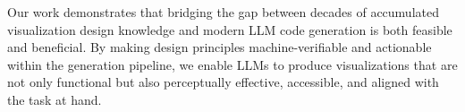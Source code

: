 \documentclass[journal]{vgtc}
\begin{document}
Our work demonstrates that bridging the gap between decades of accumulated visualization design knowledge and modern LLM code generation is both feasible and beneficial.
By making design principles machine-verifiable and actionable within the generation pipeline, we enable LLMs to produce visualizations that are not only functional but also perceptually effective, accessible, and aligned with the task at hand.



\end{document}
